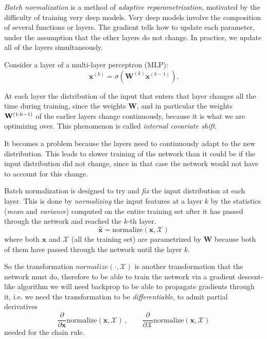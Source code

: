 
\emph{Batch normalization} is a method of \emph{adaptive reparametrization}, motivated by the difficulty of training very deep models. Very deep models involve the composition of several functions or layers. The gradient tells how to update each parameter, under the assumption that the other layers do not change. In practice, we update all of the layers simultaneously.

Consider a layer of a multi-layer perceptron (MLP):
\begin{equation}
    \mathbf{x}^{(k)} = \sigma\left( \mathbf{W}^{(k)} \mathbf{x}^{(k-1)}  \right).
\end{equation}

At each layer the distribution of the input that enters that layer changes all the time during training, since the weights $\mathbf{W}$, and in particular the weights $\vb{W}^{(1:k-1)}$ of the earlier layers change continuously, because it is what we are optimizing over. This phenomenon is called \emph{internal covariate shift}.

It becomes a problem because the layers need to continuously adapt to the new distribution. This leads to slower training of the network than it could be if the input distribution did not change, since in that case the network would not have to account for this change.

Batch normalization is designed to try and \emph{fix} the input distribution at each layer. This is done by \emph{normalizing} the input features at a layer $k$ by the statistics (\emph{mean} and \emph{variance}) computed on the entire training set after it has passed through the network and reached the $k$-th layer.
\begin{equation}
    \hat{\mathbf{x}} = \mathrm{normalize}(\mathbf{x}, \mathcal{X})
\end{equation}
where both $\mathbf{x}$ and $\mathcal{X}$ (all the training set) are parametrized by $\mathbf{W}$ because
both of them have passed through the network until the layer $k$.

So the transformation $normalize(\cdot, \mathcal{X})$ is another transformation that the network must do, therefore to be able to train the network via a gradient descent-like algorithm we will need backprop to be able to propagate gradients through it, i.e. we need the transformation to be \emph{differentiable}, to admit partial derivatives
\begin{equation}
    \frac{\partial}{\partial \mathbf{x}} \mathrm{normalize}(\mathbf{x}, \mathcal{X})\,, \quad\quad \frac{\partial}{\partial \mathcal{X}} \mathrm{normalize}(\mathbf{x}, \mathcal{X})
\end{equation}
needed for the chain rule.

